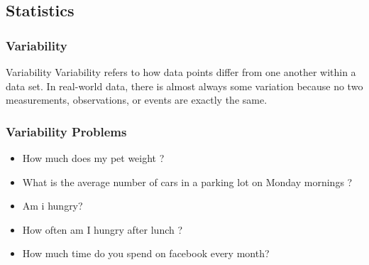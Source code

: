 \documentclass{beamer}
\begin{document}
\subsection{Statistics}
\begin{frame}
    \frametitle{Variability}
    \begin{block}{Variability}
        Variability refers to how data points differ from one another within a data set. In real-world data, there is almost always some variation because no two measurements, observations, or events are exactly the same.
    \end{block}
\end{frame}

\begin{frame}
    \frametitle{Variability Problems}
        \begin{itemize}
            \item How much does my pet weight ?
            \item What is the average number of cars in a parking lot on Monday mornings ?
            \item Am i hungry?
            \item How often am I hungry after lunch ? 
            \item How much time do you spend on facebook every month? 
        \end{itemize}
\end{frame}

    




\end{document}
